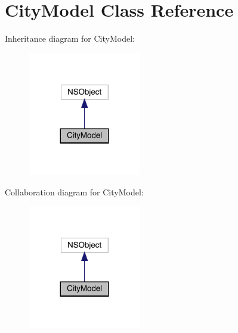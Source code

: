 \hypertarget{interface_city_model}{}\section{City\+Model Class Reference}
\label{interface_city_model}


Inheritance diagram for City\+Model\+:\nopagebreak
\begin{figure}[H]
\begin{center}
\leavevmode
\includegraphics[width=140pt]{interface_city_model__inherit__graph}
\end{center}
\end{figure}


Collaboration diagram for City\+Model\+:\nopagebreak
\begin{figure}[H]
\begin{center}
\leavevmode
\includegraphics[width=140pt]{interface_city_model__coll__graph}
\end{center}
\end{figure}
